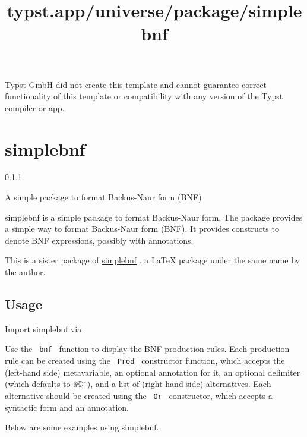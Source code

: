 Typst GmbH did not create this template and cannot guarantee correct
functionality of this template or compatibility with any version of the
Typst compiler or app.


\title{typst.app/universe/package/simplebnf}

\label{banner}
\section{simplebnf}\label{simplebnf}

{ 0.1.1 }

A simple package to format Backus-Naur form (BNF)

\label{readme}
simplebnf is a simple package to format Backus-Naur form. The package
provides a simple way to format Backus-Naur form (BNF). It provides
constructs to denote BNF expressions, possibly with annotations.

This is a sister package of
\href{https://github.com/Zeta611/simplebnf}{simplebnf} , a LaTeX package
under the same name by the author.

\subsection{Usage}\label{usage}

Import simplebnf via

\begin{Shaded}
\begin{Highlighting}[]
\end{Highlighting}
\end{Shaded}

Use the \texttt{\ bnf\ } function to display the BNF production rules.
Each production rule can be created using the \texttt{\ Prod\ }
constructor function, which accepts the (left-hand side) metavariable,
an optional annotation for it, an optional delimiter (which defaults to
â©´), and a list of (right-hand side) alternatives. Each alternative
should be created using the \texttt{\ Or\ } constructor, which accepts a
syntactic form and an annotation.

Below are some examples using simplebnf.

\begin{Shaded}
\begin{Highlighting}[]
\NormalTok{    \{}
\NormalTok{    \},}
\NormalTok{  ),}
\NormalTok{)}
\end{Highlighting}
\end{Shaded}

